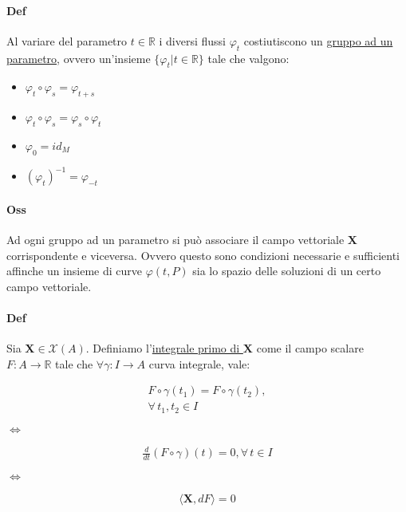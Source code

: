 \paragraph*{Def} Al variare del parametro $t\in \mathbb{R}$ i diversi flussi $\varphi_t$ costiutiscono un \underline{gruppo ad un parametro}, ovvero un'insieme $\{\varphi_t|t\in \mathbb{R}\}$ tale che valgono:
\begin{itemize}
    \item $\varphi_t\circ \varphi_s=\varphi_{t+s}$
    \item $\varphi_t\circ\varphi_s=\varphi_s\circ \varphi_t$
    \item $\varphi_0=id_M$
    \item $(\varphi_t)^{-1}=\varphi_{-t}$
\end{itemize}
\paragraph*{Oss} Ad ogni gruppo ad un parametro si può associare il campo vettoriale $\mathbf{X}$ corrispondente e viceversa. Ovvero questo sono condizioni necessarie e sufficienti affinche un insieme di curve $\varphi(t,P)$ sia lo spazio delle soluzioni di un certo campo vettoriale.
%
\paragraph*{Def} Sia $\mathbf{X}\in \mathcal{X}(A)$. Definiamo l'\underline{integrale primo di $\mathbf{X}$} come il campo scalare $F\colon A\to \mathbb{R}$ tale che $\forall \gamma \colon I \to A$ curva integrale, vale:\\
\begin{minipage}{4cm}
    \begin{align*}
   F\circ \gamma (t_1)=F\circ \gamma (t_2),\\
   \forall\, t_1,t_2\in I
    \end{align*}
    \end{minipage}$\iff$
    \begin{minipage}{4cm}
   \begin{align*}
    \frac{d}{dt}(F\circ\gamma)(t)=0, \forall \, t\in I
   \end{align*}
    \end{minipage}$\iff$
    \begin{minipage}{3cm}
        \begin{align*}
         \langle \mathbf{X},dF\rangle =0
        \end{align*}
         \end{minipage}
%
%
